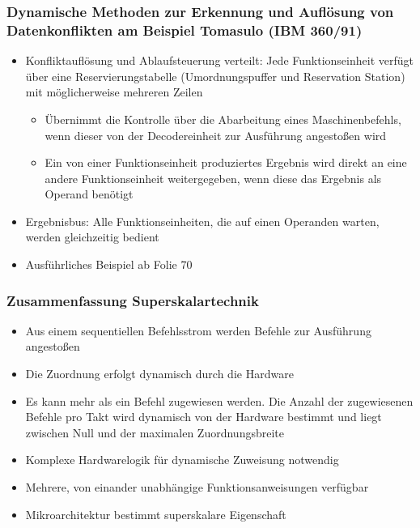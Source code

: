 \subsubsection{Dynamische Methoden zur Erkennung und Auflösung von Datenkonflikten am Beispiel Tomasulo (IBM 360/91)}
\begin{itemize}
	\item Konfliktauflösung und Ablaufsteuerung verteilt: Jede Funktionseinheit verfügt über eine Reservierungstabelle (Umordnungspuffer und Reservation Station) mit möglicherweise mehreren Zeilen
	\begin{itemize}
		\item Übernimmt die Kontrolle über die Abarbeitung eines Maschinenbefehls, wenn dieser von der Decodereinheit zur Ausführung angestoßen wird
		\item Ein von einer Funktionseinheit produziertes Ergebnis wird direkt an eine andere Funktionseinheit weitergegeben, wenn diese das Ergebnis als Operand benötigt
	\end{itemize}
	\item Ergebnisbus: Alle Funktionseinheiten, die auf einen Operanden warten, werden gleichzeitig bedient
	\item Ausführliches Beispiel ab Folie 70
\end{itemize}

\subsubsection{Zusammenfassung Superskalartechnik}
\begin{itemize}
	\item Aus einem sequentiellen Befehlsstrom werden Befehle zur Ausführung angestoßen
	\item Die Zuordnung erfolgt dynamisch durch die Hardware
	\item Es kann mehr als ein Befehl zugewiesen werden. Die Anzahl der zugewiesenen Befehle pro Takt wird dynamisch von der Hardware bestimmt und liegt zwischen Null und der maximalen Zuordnungsbreite
	\item Komplexe Hardwarelogik für dynamische Zuweisung notwendig
	\item Mehrere, von einander unabhängige Funktionsanweisungen verfügbar
	\item Mikroarchitektur bestimmt superskalare Eigenschaft
\end{itemize}


